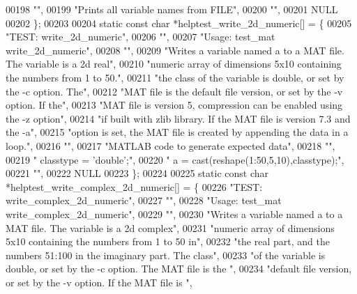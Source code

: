 \begin{DoxyCode}
00198     \textcolor{stringliteral}{""},
00199     \textcolor{stringliteral}{"Prints all variable names from FILE"},
00200     \textcolor{stringliteral}{""},
00201     NULL
00202 \};
00203 
00204 \textcolor{keyword}{static} \textcolor{keyword}{const} \textcolor{keywordtype}{char} *helptest\_write\_2d\_numeric[] = \{
00205     \textcolor{stringliteral}{"TEST: write\_2d\_numeric"},
00206     \textcolor{stringliteral}{""},
00207     \textcolor{stringliteral}{"Usage: test\_mat write\_2d\_numeric"},
00208     \textcolor{stringliteral}{""},
00209     \textcolor{stringliteral}{"Writes a variable named a to a MAT file. The variable is a 2d real"},
00210     \textcolor{stringliteral}{"numeric array of dimensions 5x10 containing the numbers from 1 to 50."},
00211     \textcolor{stringliteral}{"the class of the variable is double, or set by the -c option. The"},
00212     \textcolor{stringliteral}{"MAT file is the default file version, or set by the -v option. If the"},
00213     \textcolor{stringliteral}{"MAT file is version 5, compression can be enabled using the -z option"},
00214     \textcolor{stringliteral}{"if built with zlib library. If the MAT file is version 7.3 and the -a"},
00215     \textcolor{stringliteral}{"option is set, the MAT file is created by appending the data in a loop."},
00216     \textcolor{stringliteral}{""},
00217     \textcolor{stringliteral}{"MATLAB code to generate expected data"},
00218     \textcolor{stringliteral}{""},
00219     \textcolor{stringliteral}{"    classtype = 'double';"},
00220     \textcolor{stringliteral}{"    a = cast(reshape(1:50,5,10),classtype);"},
00221     \textcolor{stringliteral}{""},
00222     NULL
00223 \};
00224 
00225 \textcolor{keyword}{static} \textcolor{keyword}{const} \textcolor{keywordtype}{char} *helptest\_write\_complex\_2d\_numeric[] = \{
00226     \textcolor{stringliteral}{"TEST: write\_complex\_2d\_numeric"},
00227     \textcolor{stringliteral}{""},
00228     \textcolor{stringliteral}{"Usage: test\_mat write\_complex\_2d\_numeric"},
00229     \textcolor{stringliteral}{""},
00230     \textcolor{stringliteral}{"Writes a variable named a to a MAT file. The variable is a 2d complex"},
00231     \textcolor{stringliteral}{"numeric array of dimensions 5x10 containing the numbers from 1 to 50 in"},
00232     \textcolor{stringliteral}{"the real part, and the numbers 51:100 in the imaginary part. The class"},
00233     \textcolor{stringliteral}{"of the variable is double, or set by the -c option. The MAT file is the "},
00234     \textcolor{stringliteral}{"default file version, or set by the -v option. If the MAT file is "},

\end{DoxyCode}
